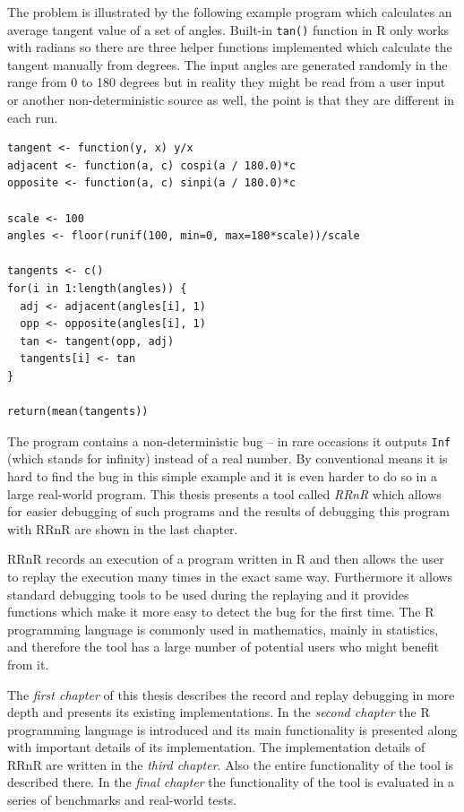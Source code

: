 \documentclass[thesis=M,english,hidelinks]{FITthesis}[2012/10/20]
\begin{document}
The problem is illustrated by the following example program which calculates an average tangent value of a set of angles. Built-in \lstinline|tan()| function in R only works with radians so there are three helper functions implemented which calculate the tangent manually from degrees. The input angles are generated randomly in the range from 0 to 180 degrees but in reality they might be read from a user input or another non-deterministic source as well, the point is that they are different in each run.\par

\begin{lstlisting}[style=filestyle, caption={The program containing a non-deterministic bug}, label=example_program]
tangent <- function(y, x) y/x
adjacent <- function(a, c) cospi(a / 180.0)*c
opposite <- function(a, c) sinpi(a / 180.0)*c

scale <- 100
angles <- floor(runif(100, min=0, max=180*scale))/scale

tangents <- c()
for(i in 1:length(angles)) {
  adj <- adjacent(angles[i], 1)
  opp <- opposite(angles[i], 1)
  tan <- tangent(opp, adj)
  tangents[i] <- tan
}

return(mean(tangents))
\end{lstlisting}

The program contains a non-deterministic bug -- in rare occasions it outputs \lstinline|Inf| (which stands for infinity) instead of a real number. By conventional means it is hard to find the bug in this simple example and it is even harder to do so in a large real-world program. This thesis presents a tool called \emph{RRnR} which allows for easier debugging of such programs and the results of debugging this program with RRnR are shown in the last chapter.\par

RRnR records an execution of a program written in R and then allows the user to replay the execution many times in the exact same way. Furthermore it allows standard debugging tools to be used during the replaying and it provides functions which make it more easy to detect the bug for the first time. The R programming language is commonly used in mathematics, mainly in statistics, and therefore the tool has a large number of potential users who might benefit from it.\par

The \emph{first chapter} of this thesis describes the record and replay debugging in more depth and presents its existing implementations. In the \emph{second chapter} the R programming language is introduced and its main functionality is presented along with important details of its implementation. The implementation details of RRnR are written in the \emph{third chapter}. Also the entire functionality of the tool is described there. In the \emph{final chapter} the functionality of the tool is evaluated in a series of benchmarks and real-world tests.\par
\end{document}
